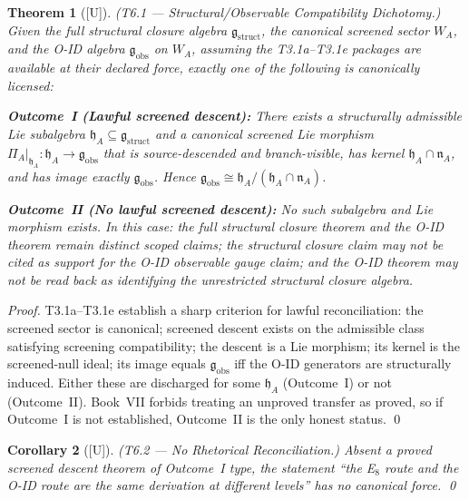 \documentclass[12pt,oneside]{amsbook}
\theoremstyle{plain}
\newtheorem{theorem}{Theorem}[section]
\newtheorem{corollary}[theorem]{Corollary}
\theoremstyle{definition}
\theoremstyle{remark}
\newcommand{\status}[1]{\textup{[#1]}}
\begin{document}
\begin{theorem}[\status{U}]\label{thm:T6-dichotomy}
\textup{(T6.1 --- Structural/Observable Compatibility Dichotomy.)}
Given the full structural closure algebra $\mathfrak{g}_{\mathrm{struct}}$,
the canonical screened sector $W_A$, and the O-ID algebra
$\mathfrak{g}_{\mathrm{obs}}$ on $W_A$, assuming the T3.1a--T3.1e packages
are available at their declared force, exactly one of the following is
canonically licensed:

\textbf{Outcome~I (Lawful screened descent):} There exists a structurally
admissible Lie subalgebra
$\mathfrak{h}_A \subseteq \mathfrak{g}_{\mathrm{struct}}$ and a canonical
screened Lie morphism
$\Pi_A|_{\mathfrak{h}_A} : \mathfrak{h}_A \to \mathfrak{g}_{\mathrm{obs}}$
that is source-descended and branch-visible, has kernel
$\mathfrak{h}_A \cap \mathfrak{n}_A$, and has image exactly
$\mathfrak{g}_{\mathrm{obs}}$. Hence
$\mathfrak{g}_{\mathrm{obs}} \cong \mathfrak{h}_A /
(\mathfrak{h}_A \cap \mathfrak{n}_A)$.

\textbf{Outcome~II (No lawful screened descent):} No such subalgebra and
Lie morphism exists. In this case: the full structural closure theorem and
the O-ID theorem remain distinct scoped claims; the structural closure claim
may not be cited as support for the O-ID observable gauge claim; and the O-ID
theorem may not be read back as identifying the unrestricted structural closure
algebra.
\end{theorem}

\begin{proof}
T3.1a--T3.1e establish a sharp criterion for lawful reconciliation: the
screened sector is canonical; screened descent exists on the admissible class
satisfying screening compatibility; the descent is a Lie morphism; its kernel is
the screened-null ideal; its image equals $\mathfrak{g}_{\mathrm{obs}}$ iff the
O-ID generators are structurally induced. Either these are discharged for some
$\mathfrak{h}_A$ (Outcome~I) or not (Outcome~II). Book~VII forbids treating an
unproved transfer as proved, so if Outcome~I is not established, Outcome~II is
the only honest status. \qed
\end{proof}

\begin{corollary}[\status{U}]\label{cor:T6-no-rhetoric}
\textup{(T6.2 --- No Rhetorical Reconciliation.)}
Absent a proved screened descent theorem of Outcome~I type, the statement
``the E$_8$ route and the O-ID route are the same derivation at different levels''
has no canonical force. \qed
\end{corollary}
\end{document}
